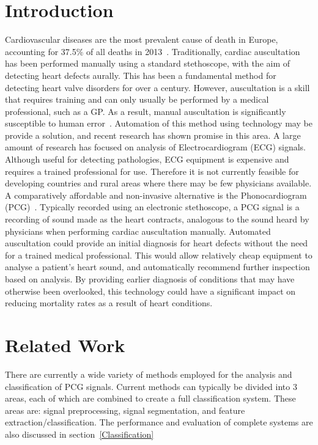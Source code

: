 \documentclass[titlepage, 12pt]{scrartcl} \usepackage{enumitem}
\begin{document}
\section{Introduction}
Cardiovascular diseases are the most prevalent cause of death in Europe,
accounting for 37.5\% of all deaths in 2013~\parencite{Eurostat2016}.
Traditionally, cardiac auscultation has been performed manually using a standard
stethoscope, with the aim of detecting heart defects aurally. This has been a
fundamental method for detecting heart valve disorders for over a century.
However, auscultation is a skill that requires training and can only usually be
performed by a medical professional, such as a GP. As a result, manual
auscultation is significantly susceptible to human error~\parencite{Hanna2002}.
Automation of this method using technology may be provide a solution, and
recent research has shown promise in this area. A large amount of research has
focused on analysis of Electrocardiogram (ECG) signals.  Although useful for
detecting pathologies, ECG equipment is expensive and requires a trained
professional for use. Therefore it is not currently feasible for developing
countries and rural areas where there may be few physicians available. A
comparatively affordable and non-invasive alternative is the Phonocardiogram
(PCG)~\parencite[p.130]{Reed2004}. Typically recorded using an electronic
stethoscope, a PCG signal is a recording of sound made as the heart contracts,
analogous to the sound heard by physicians when performing cardiac auscultation
manually. Automated auscultation could provide an initial diagnosis for heart
defects without the need for a trained medical professional. This would allow
relatively cheap equipment to analyse a patient's heart sound, and
automatically recommend further inspection based on analysis.  By providing
earlier diagnosis of conditions that may have otherwise been overlooked, this
technology could have a significant impact on reducing mortality rates as a
result of heart conditions.

\section{Related Work}
There are currently a wide variety of methods employed for the analysis and
classification of PCG signals. Current methods can typically be divided into 3
areas, each of which are combined to create a full classification system. These
areas are: signal preprocessing, signal segmentation, and feature
extraction/classification. The performance and evaluation of complete systems
are also discussed in section~\ref{Classification}
\end{document}
